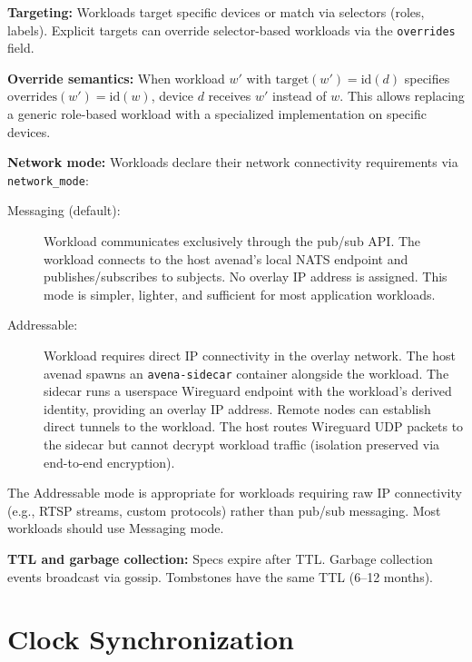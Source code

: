 \textbf{Targeting:} Workloads target specific devices or match via selectors (roles, labels). Explicit targets can override selector-based workloads via the \texttt{overrides} field.

\textbf{Override semantics:} When workload $w'$ with $\text{target}(w') = \text{id}(d)$ specifies $\text{overrides}(w') = \text{id}(w)$, device $d$ receives $w'$ instead of $w$. This allows replacing a generic role-based workload with a specialized implementation on specific devices.

\textbf{Network mode:} Workloads declare their network connectivity requirements via \texttt{network\_mode}:

\begin{description}
    \item[Messaging (default):] Workload communicates exclusively through the pub/sub API. The workload connects to the host avenad's local NATS endpoint and publishes/subscribes to subjects. No overlay IP address is assigned. This mode is simpler, lighter, and sufficient for most application workloads.

    \item[Addressable:] Workload requires direct IP connectivity in the overlay network. The host avenad spawns an \texttt{avena-sidecar} container alongside the workload. The sidecar runs a userspace Wireguard endpoint with the workload's derived identity, providing an overlay IP address. Remote nodes can establish direct tunnels to the workload. The host routes Wireguard UDP packets to the sidecar but cannot decrypt workload traffic (isolation preserved via end-to-end encryption).
\end{description}

The Addressable mode is appropriate for workloads requiring raw IP connectivity (e.g., RTSP streams, custom protocols) rather than pub/sub messaging. Most workloads should use Messaging mode.

\textbf{TTL and garbage collection:} Specs expire after TTL. Garbage collection events broadcast via gossip. Tombstones have the same TTL (6--12 months).

\section{Clock Synchronization}

